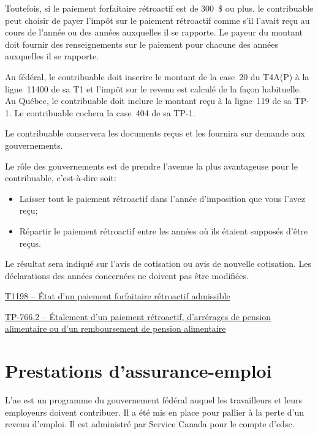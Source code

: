Toutefois, si le paiement forfaitaire rétroactif est de 300~\$ ou plus, le contribuable peut choisir de payer l'impôt sur le paiement rétroactif comme s'il l'avait reçu au cours de l'année ou des années auxquelles il se rapporte. Le payeur du montant doit fournir des renseignements sur le paiement pour chacune des années auxquelles il se rapporte.

Au fédéral, le contribuable doit inscrire le montant de la case~20 du T4A(P) à la ligne~11400 de sa T1 et l'impôt sur le revenu est calculé de la façon habituelle. Au Québec, le contribuable doit inclure le montant reçu à la ligne~119 de sa TP-1. Le contribuable cochera la case~404 de sa TP-1.

Le contribuable conservera les documents reçus et les fournira sur demande aux gouvernements.

Le rôle des gouvernements est de prendre l'avenue la plus avantageuse pour le contribuable, c'est-à-dire soit:
\begin{itemize}
	\item Laisser tout le paiement rétroactif dans l'année d'imposition que vous l'avez reçu;
	\item Répartir le paiement rétroactif entre les années où ils étaient supposés d'être reçus.
\end{itemize}

Le résultat sera indiqué sur l'avis de cotisation ou avis de nouvelle cotisation. Les déclarations des années concernées ne doivent pas être modifiées.

\cat\href{https://www.canada.ca/fr/agence-revenu/services/formulaires-publications/formulaires/t1198.html}{T1198 -- État d'un paiement forfaitaire rétroactif admissible}

\qct\href{https://www.revenuquebec.ca/documents/fr/formulaires/tp/tp-766.2(2017-10).pdf}{TP-766.2 -- Étalement d'un paiement rétroactif, d'arrérages de pension alimentaire ou d'un remboursement de pension alimentaire}


\section{Prestations d'assurance-emploi}
\begin{intro}
	L'\acrfull{ae} est un programme du gouvernement fédéral auquel les travailleurs et leurs employeurs doivent contribuer. Il a été mis en place pour pallier à la perte d'un revenu d'emploi. Il est administré par Service Canada pour le compte d'\acrfull{edsc}.
\end{intro}

